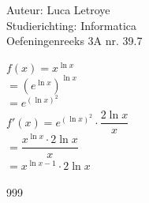 \documentclass[a4paper]{article}
\begin{document}
  
\noindent \large Auteur: Luca Letroye        \\
\noindent \large Studierichting: Informatica \\
\noindent \large Oefeningenreeks 3A nr. 39.7 \\

\medskip

\normalsize

$f(x) = x^{\ln x}$\\

$= \left(e^{\ln x} \right)^{\ln x}$\\

$= e^{(\ln x)^2} $\\

$f'(x) = e^{(\ln x)^2} \cdot \dfrac{2\ln x}{x}$\\

$= \dfrac{x^{\ln x} \cdot 2\ln x}{x}$\\

$= x^{\ln x- 1} \cdot 2\ln x$\\


\begin{thebibliography}{999}
\end{thebibliography}
\end{document}
